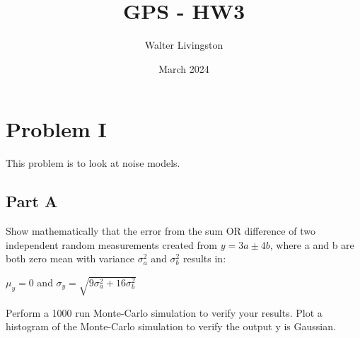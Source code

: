 \documentclass{article}
\title{GPS - HW3}
\author{Walter Livingston}
\date{March 2024}
\begin{document}
\maketitle

\section*{Problem I}
This problem is to look at noise models.

\subsection*{Part A}
Show mathematically that the error from the sum OR difference of two independent random measurements created from $y = 3a \pm 4b$, where a and b are both zero mean with variance $\sigma_a^2$ and $\sigma_b^2$ results in:
    \begin{center}
    $\mu_y = 0$ and $\sigma_y = \sqrt{9\sigma_a^2 + 16\sigma_b^2}$
    \end{center}
Perform a 1000 run Monte-Carlo simulation to verify your results.  Plot a histogram of the Monte-Carlo simulation to verify the output y is Gaussian.
\end{document}
